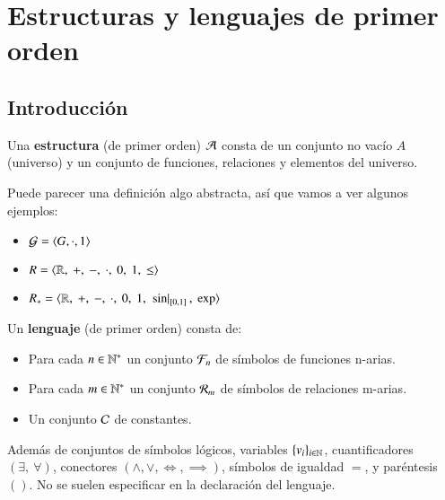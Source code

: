 
\chapter{Estructuras y lenguajes de primer orden}
\section{Introducción}
\begin{dfn}[Estructura]\label{dfn:estructura}
    Una \textbf{estructura} (de primer orden) $\mathcal{A}$ consta de un conjunto no vacío $A$ (universo) y un conjunto de funciones, relaciones y elementos del universo.
\end{dfn}
Puede parecer una definición algo abstracta, así que vamos a ver algunos ejemplos:
\begin{eg}
    \begin{itemize}
        \item $ \mathcal{G} = \langle G, \cdot, 1\rangle $
        \item $ R = \langle\mathbb{R},\  +,\  -,\  \cdot,\  0,\  1,\  \leq\rangle $
        \item $ R_* = \langle\mathbb{R},\  +,\  -,\  \cdot,\  0,\  1,\ \left. \sin \right|_{[0, 1]},\  \exp\rangle$
    \end{itemize}
\end{eg}

\begin{dfn}[Lenguaje]\label{dfn:lenguaje}
    Un \textbf{lenguaje} (de primer orden) consta de:\\
    \begin{itemize}
        \item Para cada $n \in \mathbb{N}^*$ un conjunto $\mathcal{F}_n$ de símbolos de funciones n-arias.
        \item Para cada $m \in \mathbb{N}^*$ un conjunto $\mathcal{R}_m$ de símbolos de relaciones m-arias.
        \item Un conjunto $\mathcal{C}$ de constantes.
    \end{itemize}
    Además de conjuntos de símbolos lógicos, variables $\{v_i\}_{i\in \mathbb{N}}$, cuantificadores $(\exists,\ \forall)$, conectores $(\land, \lor, \iff, \implies)$, símbolos de igualdad $=$, y paréntesis $()$. No se suelen especificar en la declaración del lenguaje.
\end{dfn}

